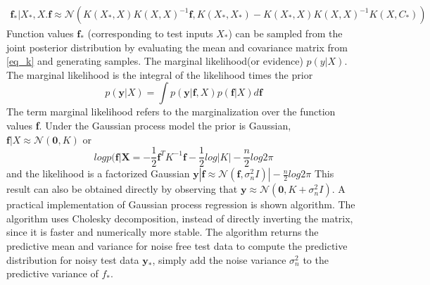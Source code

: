 \begin{multline*}
	\label{eq_k}
	\textbf{f}_*|X_*,X. \textbf{f} \approx \mathcal{N} \left( K(X_*, X) K(X, X)^{-1}\textbf{f}, K(X_*, X_*)-K(X_*, X)K(X,X)^{-1}K(X, C_*) \right)
\end{multline*}
Function values $\textbf{f}_*$ (corresponding to test inputs $X_*$) can be sampled from the joint posterior distribution by evaluating the mean and covariance matrix from \eqref{eq_k} and generating samples.
The marginal likelihood(or evidence) $p(y|X)$. The marginal likelihood is the integral of the likelihood times the prior
\begin{equation}
	p(\textbf{y}|X) = \int p(\textbf{y}|\textbf{f}, X)p(\textbf{f}|X)d\textbf{f}
\end{equation}
The term marginal likelihood refers to the marginalization over the function values \textbf{f}. Under the Gaussian process model the prior is Gaussian, $\textbf{f}|X \approx \mathcal{N}(\textbf{0}, K)$ or
\begin{equation}
	log p(\textbf{f|X} = -\frac{1}{2} \textbf{f}^TK^{-1}\textbf{f}-\frac{1}{2} log |K| - \frac{n}{2} log 2\pi
\end{equation}
and the likelihood is a factorized Gaussian $\textbf{y}|\textbf{f} \approx \mathcal{N}(\textbf{f}, \sigma^2_nI)| - \frac{n}{2} log2\pi$
This result can also be obtained directly by observing that $\textbf{y} \approx \mathcal{N}(\textbf{0}, K+\sigma^2_nI)$.
A practical implementation \cite{rasmussen2003gaussian} of Gaussian process regression is shown algorithm. The algorithm uses Cholesky decomposition, instead of directly inverting the matrix, since it is faster and numerically more stable. The algorithm returns the predictive mean and variance for noise free test data to compute the predictive distribution for noisy test data $\textbf{y}_*$, simply add the noise variance $\sigma^2_n$ to the predictive variance of $f_*$.
